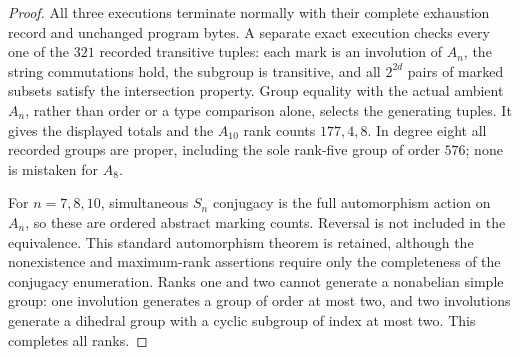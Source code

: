 \documentclass[11pt,a4paper]{article}
\begin{document}
\begin{proof}
All three executions terminate normally with their complete
exhaustion record and unchanged program bytes. A separate exact
execution checks every one of the $321$ recorded transitive
tuples: each mark is an involution of $A_n$, the string
commutations hold, the subgroup is transitive, and all
$2^{2d}$ pairs of marked subsets satisfy the intersection
property. Group equality with the actual ambient $A_n$,
rather than order or a type comparison alone, selects the
generating tuples. It gives the displayed totals and the
$A_{10}$ rank counts $177,4,8$. In degree eight all recorded
groups are proper, including the sole rank-five group of
order $576$; none is mistaken for $A_8$.

For $n=7,8,10$, simultaneous $S_n$ conjugacy is the full
automorphism action on $A_n$, so these are ordered abstract
marking counts. Reversal is not included in the equivalence.
This standard automorphism theorem is retained, although the
nonexistence and maximum-rank assertions require only the
completeness of the conjugacy enumeration. Ranks one and two
cannot generate a nonabelian simple group: one involution
generates a group of order at most two, and two involutions
generate a dihedral group with a cyclic subgroup of index at
most two. This completes all ranks.
\end{proof}
\end{document}
